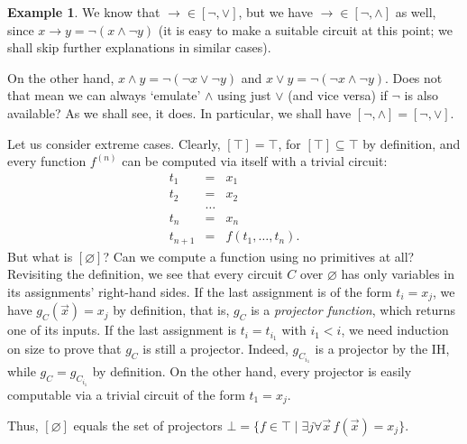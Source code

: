 \documentclass[12pt,notitlepage]{article}
\theoremstyle{plain}
\theoremstyle{definition}
\newtheorem{exm}[thm]{Example}
\theoremstyle{plain}
\newcommand{\sbs}{\subseteq}
\newcommand{\void}{\varnothing}
\newcommand{\1}{\mathbf{1}}
\newcommand{\0}{\mathbf{0}}
\begin{document}
\begin{exm}
We know that ${\to} \in [{\neg}, {\vee}]$, but we have ${\to} \in [{\neg}, {\wedge}]$ as well, since $x \to y = \neg (x \wedge \neg y)$ (it is easy to make a suitable circuit at this point; we shall skip further explanations in similar cases).

On the other hand, $x \wedge y = \neg (\neg x \vee \neg y)$ and $x \vee y = \neg (\neg x \wedge \neg y)$. Does not that mean we can always `emulate' $\wedge$ using just $\vee$ (and vice versa) if $\neg$ is also available? As we shall see, it does. In particular, we shall have $[{\neg}, {\wedge}] = [{\neg}, {\vee}]$.

Let us consider extreme cases. Clearly, $[\top] = \top$, for $[\top] \sbs \top$ by definition, and every function $f^{(n)}$ can be computed via itself with a trivial circuit:
\begin{equation}\label{bool:triv_circ}
\begin{array}{rcl}
t_1 &=& x_1\\
t_2 &=& x_2\\
&\ldots&\\
t_n &=& x_n\\
t_{n+1} &=& f(t_1, \ldots, t_n).
\end{array}
\end{equation}
But what is $[\void]$? Can we compute a function using no primitives at all? Revisiting the definition, we see that every circuit $C$ over $\void$ has only variables in its assignments' right-hand sides. If the last assignment is of the form $t_i = x_j$, we have $g_C(\vec x) = x_j$ by definition, that is, $g_C$ is a \emph{projector function}, which returns one of its inputs. If the last assignment is $t_i = t_{i_1}$ with $i_1 < i$, we need induction on size to prove that $g_C$ is still a projector. Indeed, $g_{C_{i_1}}$ is a projector by the IH, while $g_C = g_{C_{i_1}}$ by definition. On the other hand, every projector is easily computable via a trivial circuit of the form $t_1 = x_j$.

Thus, $[\void]$ equals the set of projectors $\bot = \{ f\in \top \mid \exists j \forall \vec x\, f(\vec x)  = x_j \}$.
\end{exm}
\end{document}
